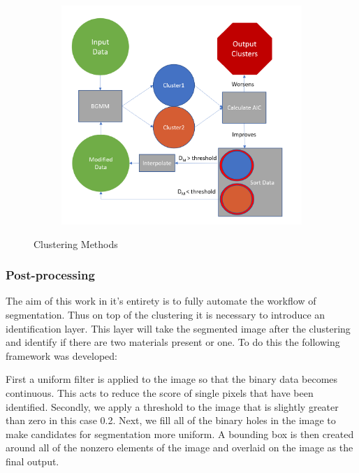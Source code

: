 \documentclass[a4paper,11pt]{article}
\begin{document}
\begin{figure}[t!]
\begin{subfigure}[b]{0.32\textwidth}
    \end{subfigure}
    \begin{subfigure}[b]{0.32\textwidth}
        \includegraphics[width=\textwidth]{figures/algo_flow.png}
    \end{subfigure}
    \caption{Clustering Methods}
    \label{iterative_method}
\end{figure}

\subsubsection{Post-processing}

The aim of this work in it's entirety is to fully automate the workflow of segmentation. Thus on top of the clustering it is necessary to introduce an identification layer. This layer will take the segmented image after the clustering and identify if there are two materials present or one. To do this the following framework was developed:

First a uniform filter is applied to the image so that the binary data becomes continuous. This acts to reduce the score of single pixels that have been identified. Secondly, we apply a threshold to the image that is slightly greater than zero in this case 0.2. Next, we fill all of the binary holes in the image to make candidates for segmentation more uniform. A bounding box is then created around all of the nonzero elements of the image and overlaid on the image as the final output.
\end{document}

